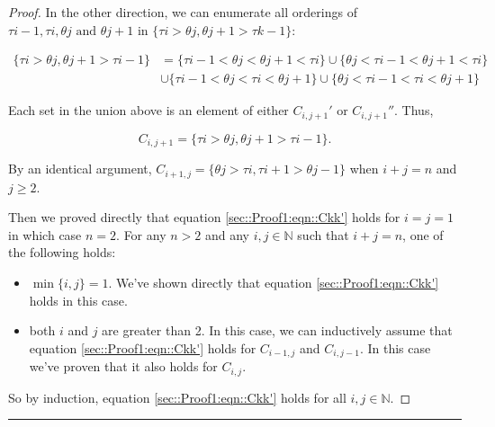 \documentclass[12pt]{article}
\newcommand{\mb}{\mathbb}
\newcommand{\te}{\text}
\newcommand{\lin}{\rule{\linewidth}{0.4 pt}}
\newcommand{\rt}{\tau}							%
\newcommand{\rtt}{\theta}						%
\renewcommand{\it}{k}							%
\newcommand{\pathsete}[2]{C_{#1,#2}}			%
\begin{document}
\begin{proof}
In the other direction, we can enumerate all orderings of \(\rt{i-1},\rt{i},\rtt{j}\te{ and } \rtt{j+1}\) in \(\{\rt{i} > \rtt{j}, \rtt{j+1} > \rt{\it-1}\}\):

\begin{align*}
\{\rt{i} > \rtt{j},\rtt{j+1} > \rt{i-1}\} &= \{\rt{i-1} < \rtt{j} < \rtt{j+1} < \rt{i}\} \cup \{\rtt{j} < \rt{i-1} < \rtt{j+1} < \rt{i}\}\\
&\cup \{\rt{i-1} < \rtt{j} < \rt{i} < \rtt{j+1}\} \cup \{\rtt{j} < \rt{i-1} <\rt{i} < \rtt{j+1}\}
\end{align*}

Each set in the union above is an element of either \(\pathsete{i}{j+1}'\) or \(\pathsete{i}{j+1}''\). Thus,

\[\pathsete{i}{j+1} = \{\rt{i} > \rtt{j},\rtt{j+1} > \rt{i-1}\}.\]

By an identical argument, \(\pathsete{i+1}{j} = \{\rtt{j} > \rt{i},\rt{i+1} > \rtt{j-1}\}\) when \(i + j = n\) and \(j \geq 2\).

Then we proved directly that equation \eqref{sec::Proof1:eqn::Ckk'} holds for \(i = j=1\) in which case \(n = 2\). For any \(n > 2\) and any \(i,j\in \mb{N}\) such that \(i + j = n\), one of the following holds:

\begin{itemize}
\item \(\min\{i,j\} = 1\). We've shown directly that equation \eqref{sec::Proof1:eqn::Ckk'} holds in this case.

\item both \(i\) and \(j\) are greater than 2. In this case, we can inductively assume that equation \eqref{sec::Proof1:eqn::Ckk'} holds for \(\pathsete{i-1}{j}\) and \(\pathsete{i}{j-1}\). In this case we've proven that it also holds for \(\pathsete{i}{j}\).
\end{itemize}

So by induction, equation \eqref{sec::Proof1:eqn::Ckk'} holds for all \(i,j\in \mb{N}\).
\end{proof}

\lin
\end{document}
